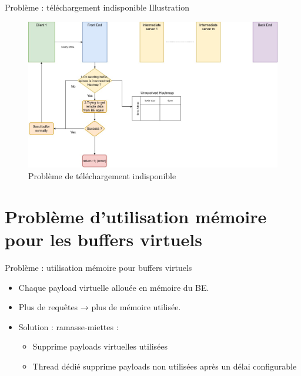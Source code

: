 \documentclass[aspectratio=43,8pt]{beamer}
\begin{document}
\begin{frame}{Problème : téléchargement indisponible Illustration}
    \begin{figure}
        \centering
        \includegraphics[width=\textwidth]{img2/odb_c_best_effort.jpg}
        \caption{Problème de téléchargement indisponible}
    \end{figure}
\end{frame}

\section{Problème d'utilisation mémoire pour les buffers virtuels}
\begin{frame}{Problème : utilisation mémoire pour buffers virtuels}
\begin{card}
    \begin{itemize}
        \item Chaque payload virtuelle allouée en mémoire du BE.
        \item Plus de requêtes → plus de mémoire utilisée.
        \item Solution : ramasse-miettes :
        \begin{itemize}
            \item Supprime payloads virtuelles utilisées
            \item Thread dédié supprime payloads non utilisées après un délai configurable
        \end{itemize}
    \end{itemize}
\end{card}
\end{frame}
\end{document}
